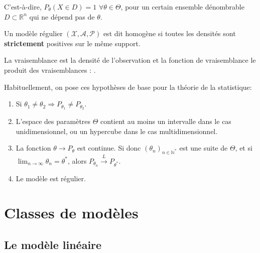 \documentclass[10pt, french]{report}
\begin{document}
\begin{multicols*}{2}
\begin{definitionNOHFILL}
C'est-à-dire, $P_{\theta}(X \in D) = 1$ $\forall \theta \in \Theta$, pour un certain ensemble dénombrable $D \subset \mathbb{R}^{n}$ qui ne dépend pas de $\theta$.
\end{definitionNOHFILL}

\begin{definitionNOHFILL}
Un modèle régulier $(\mathcal{X}, \mathcal{A}, \mathcal{P})$ est dit homogène si toutes les densités sont \textbf{strictement} positives sur le même support.
\end{definitionNOHFILL}


\begin{definitionNOHFILL}
La vraisemblance est la densité de l'observation et la fonction de vraisemblance le produit des vraisemblances : .
\end{definitionNOHFILL}


Habituellement, on pose ces hypothèses de base pour la théorie de la statistique:
\begin{enumerate}[label = \circled{\arabic*}{trueblue}]
	\item	Si $\theta_{1} \neq \theta_{2} \Rightarrow P_{\theta_{1}} \neq P_{\theta_{2}}$.
	\item	L'espace des paramètres $\Theta$ contient au moins un intervalle dans le cas unidimensionnel, ou un hypercube dans le cas multidimensionnel.
	\item	La fonction $\theta \rightarrow P_{\theta}$ est continue. Si donc $(\theta_{n})_{n \in \mathbb{N}^{\ast}}$ est une suite de $\Theta$, et si $\displaystyle \lim_{n \rightarrow \infty} \theta_{n} = \theta^{\ast}$, alors $P_{\theta_{n}} \overset{L}{\longrightarrow} P_{\theta^{\ast}}$.
	\item	Le modèle est régulier.
\end{enumerate}




\columnbreak
\section{Classes de modèles}
\subsection{Le modèle linéaire}




\end{multicols*}
\end{document}
